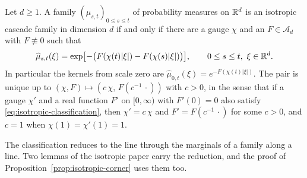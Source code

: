 \begin{theorem}\label{thm:isotropic-classification}
Let $d \ge 1$. A family $(\mu_{s,t})_{0 \le s \le t}$ of probability measures on $\mathbb{R}^d$ is an
isotropic cascade family in dimension $d$ if and only if there are a gauge $\chi$ and an
$F \in \mathcal{A}_d$ with $F \not\equiv 0$ such that
\begin{equation}\label{eq:isotropic-classification}
  \widehat\mu_{s,t}(\xi) = \exp\bigl[-\bigl(F(\chi(t)|\xi|) - F(\chi(s)|\xi|)\bigr)\bigr],
  \qquad 0 \le s \le t,\ \xi \in \mathbb{R}^d .
\end{equation}
In particular the kernels from scale zero are $\widehat\mu_{0,t}(\xi) = e^{-F(\chi(t)|\xi|)}$. The
pair is unique up to $(\chi,F) \mapsto (c\,\chi,\,F(c^{-1}\,\cdot))$ with $c > 0$, in the sense that if a gauge $\chi'$
and a real function $F'$ on $[0,\infty)$ with $F'(0) = 0$ also satisfy
\ref{eq:isotropic-classification}, then
$\chi' = c\,\chi$ and $F' = F(c^{-1}\,\cdot)$ for some $c > 0$, and $c = 1$ when
$\chi(1) = \chi'(1) = 1$.
\end{theorem}

The classification reduces to the line through the marginals of a family along a line. Two lemmas
of the isotropic paper carry the reduction, and the proof of Proposition~\ref{prop:isotropic-corner}
uses them too.

